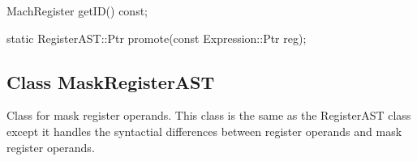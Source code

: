 \begin{apient}
  MachRegister getID() const;
\end{apient}

\begin{apient}
  static RegisterAST::Ptr promote(const Expression::Ptr reg);
\end{apient}


\subsection{Class MaskRegisterAST}
\label{sec:MaskRegisterAST}


Class for mask register operands. This class is the same as the RegisterAST
class except it handles the syntactial differences between register operands
and mask register operands.
